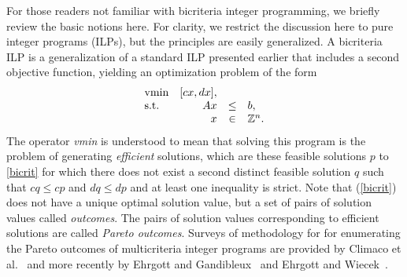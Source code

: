 For those readers not familiar with bicriteria integer programming, we briefly
review the basic notions here. For clarity, we restrict the discussion here to
pure integer programs (ILPs), but the principles are easily generalized. A
bicriteria ILP is a generalization of a standard ILP presented earlier that
includes a second objective function, yielding an optimization problem of the
form
\begin{equation}
\begin{array}{lrcl}
\vmin & [cx, dx],  \label{bicrit} \\
\textrm{s.t.} & Ax & \leq & b, \\ 
& x & \in & \Z^{n}.
\end{array}
\end{equation}
The operator \emph{vmin} is understood to mean that solving this program is
the problem of generating \emph{efficient} solutions, which are these feasible
solutions $p$ to \ref{bicrit} for which there does not exist a second
distinct feasible solution $q$ such that $cq \leq cp$ and $dq \leq dp$ and at
least one inequality is strict. Note that (\ref{bicrit}) does not have a
unique optimal solution value, but a set of pairs of solution values called
\emph{outcomes}. The pairs of solution values corresponding to efficient
solutions are called \emph{Pareto outcomes}. Surveys of methodology for for
enumerating the Pareto outcomes of multicriteria integer programs are provided
by Climaco et al.~\cite{climaco97} and more recently by Ehrgott and
Gandibleux~\cite{ehrgott00, ehrgott02} and Ehrgott and
Wiecek~\cite{ehrgott04}.

